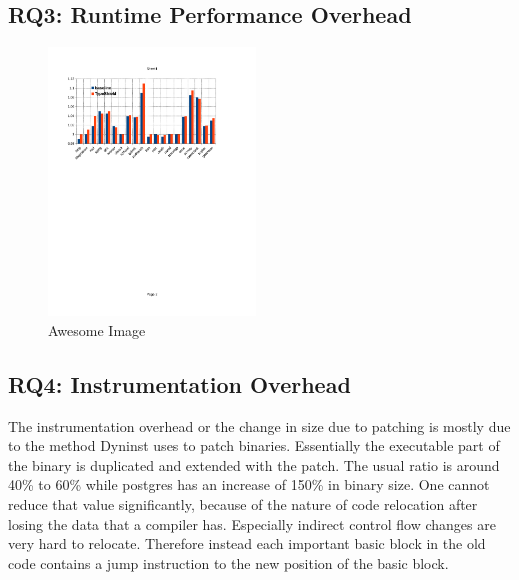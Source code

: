 \subsection{RQ3: Runtime Performance Overhead}
\label{section:typeshieldoverheadperformance}
\begin{figure}[htbp!]
    \centering
    \includegraphics[width=0.49\textwidth]{figures/speccpu2006.pdf}
    \caption{Awesome Image}
    \label{fig:awesome_image}
\end{figure}

\subsection{RQ4: Instrumentation Overhead}
\label{section:typeshieldoverheadinstrumentation}


The instrumentation overhead or the change in size due to patching is mostly due to the method Dyninst uses to patch binaries. 
Essentially the executable part of the binary is duplicated and extended with the patch. The usual ratio is around 40\% to 
60\% while postgres has an increase of 150\% in binary size. One cannot reduce that value significantly, 
because of the nature of code relocation after losing the data that a compiler has. Especially indirect control flow 
changes are very hard to relocate. Therefore instead each important basic block in the old code contains a jump 
instruction to the new position of the basic block.

